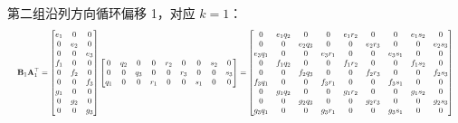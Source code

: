 ﻿\documentclass[UTF8,a4paper,11pt]{ctexart}
\begin{document}
第二组沿列方向循环偏移 1，对应 $k=1$：
\[
\resizebox{\linewidth}{!}{$\displaystyle
\mathbf{B}_1 \mathbf{A}_1^\top =
\begin{bmatrix}
e_1 & 0 & 0 \\ 0 & e_2 & 0 \\ 0 & 0 & e_3 \\
f_1 & 0 & 0 \\ 0 & f_2 & 0 \\ 0 & 0 & f_3 \\
g_1 & 0 & 0 \\ 0 & g_2 & 0 \\ 0 & 0 & g_3
\end{bmatrix}
\begin{bmatrix}
0 & q_2 & 0 & 0 & r_2 & 0 & 0 & s_2 & 0 \\
0 & 0 & q_3 & 0 & 0 & r_3 & 0 & 0 & s_3 \\
q_1 & 0 & 0 & r_1 & 0 & 0 & s_1 & 0 & 0
\end{bmatrix}
=
\begin{bmatrix}
0 & e_1 q_2 & 0 & 0 & e_1 r_2 & 0 & 0 & e_1 s_2 & 0 \\
0 & 0 & e_2 q_3 & 0 & 0 & e_2 r_3 & 0 & 0 & e_2 s_3 \\
e_3 q_1 & 0 & 0 & e_3 r_1 & 0 & 0 & e_3 s_1 & 0 & 0 \\
0 & f_1 q_2 & 0 & 0 & f_1 r_2 & 0 & 0 & f_1 s_2 & 0 \\
0 & 0 & f_2 q_3 & 0 & 0 & f_2 r_3 & 0 & 0 & f_2 s_3 \\
f_3 q_1 & 0 & 0 & f_3 r_1 & 0 & 0 & f_3 s_1 & 0 & 0 \\
0 & g_1 q_2 & 0 & 0 & g_1 r_2 & 0 & 0 & g_1 s_2 & 0 \\
0 & 0 & g_2 q_3 & 0 & 0 & g_2 r_3 & 0 & 0 & g_2 s_3 \\
g_3 q_1 & 0 & 0 & g_3 r_1 & 0 & 0 & g_3 s_1 & 0 & 0
\end{bmatrix}
$}
\]
\end{document}
